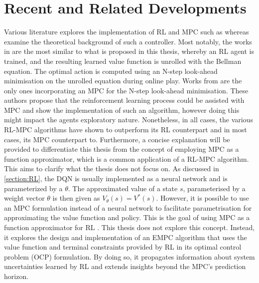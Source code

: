 \section{Recent and Related Developments}
Various literature explores the implementation of RL and MPC  such as \cite{arroyoReinforcedModelPredictive2022,beckenbachAddressingInfinitehorizonOptimization2018,lubarsCombiningReinforcementLearning2021,lubbersAutonomousGreenhouseClimate2023,sikchiLearningOffPolicyOnline2021,} whereas  \cite{beckenbachAddressingInfinitehorizonOptimization2018,bertsekasLessonsAlphaZeroOptimal,bertsekasNewtonMethodReinforcement2022,linReinforcementLearningBasedModel2023} examine the theoretical background of such a controller.
Most notably, the works in \citet{sikchiLearningOffPolicyOnline2021,arroyoReinforcedModelPredictive2022,linReinforcementLearningBasedModel2023,bertsekasLessonsAlphaZeroOptimal} are the most similar to what is proposed in this thesis, whereby an RL agent is trained, and the resulting learned value function is unrolled with the Bellman equation. The optimal action is computed using an N-step look-ahead minimisation on the unrolled equation during online play. Works from \cite{arroyoReinforcedModelPredictive2022,linReinforcementLearningBasedModel2023,beckenbachAddressingInfinitehorizonOptimization2018} are the only ones incorporating an MPC for the N-step look-ahead minimisation. These authors propose that the reinforcement learning process could be assisted with MPC and show the implementation of such an algorithm, however doing this might impact the agents exploratory nature. Nonetheless, in all cases, the various RL-MPC algorithms have shown to outperform its RL counterpart and in most cases, its MPC counterpart to. Furthermore, a concise explanation will be provided to differentiate this thesis from the concept of employing MPC as a function approximator, which is a common application of a RL-MPC algorithm. This aims to clarify what the thesis does not focus on. As discussed in \autoref{section:RL}, the DQN is usually implemented as a neural network and is parameterized by a ${\theta}$. The approximated value of a state $s$, parameterised by a weight vector  $\theta$ is then given as $ V_{\theta}(s) = V^*(s)$. However, it is possible to use an MPC formulation instead of a neural network to facilitate parametrisation for approximating the value function and policy. This is the goal of using MPC as a function approximator for RL \cite{lubbersAutonomousGreenhouseClimate2023}. This thesis does not explore this concept. Instead, it explores the design and implementation of an EMPC algorithm that uses the value function and terminal constraints provided by RL in its optimal control problem (OCP) formulation. By doing so, it propagates information about system uncertainties learned by RL and extends insights beyond the MPC's prediction horizon.

